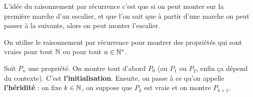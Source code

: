 L'idée du raisonnement par récurrence c'est que si on peut monter sur la première marche d'un escalier, et que l'on sait que à partir d'une marche on peut passer à la suivante, alors on peut monter l'escalier. \newline

On utilise le raisonnement par récurrence pour montrer des propriétés qui sont vraies pour tout $\mathbb{N}$ ou pour tout $n\in\mathbb{N}^*$. \newline

Soit $P_n$ une propriété. On montre tout d'abord $P_0$ (ou $P_1$ ou $P_2$, enfin ça dépend du contexte). C'est \textbf{l'initialisation}. Ensuite, on passe à ce qu'on appelle \textbf{l'héridité} : on fixe $k\in\mathbb{N}$, on suppose que $P_k$ est vraie et on montre $P_{k+1}$. \newline

